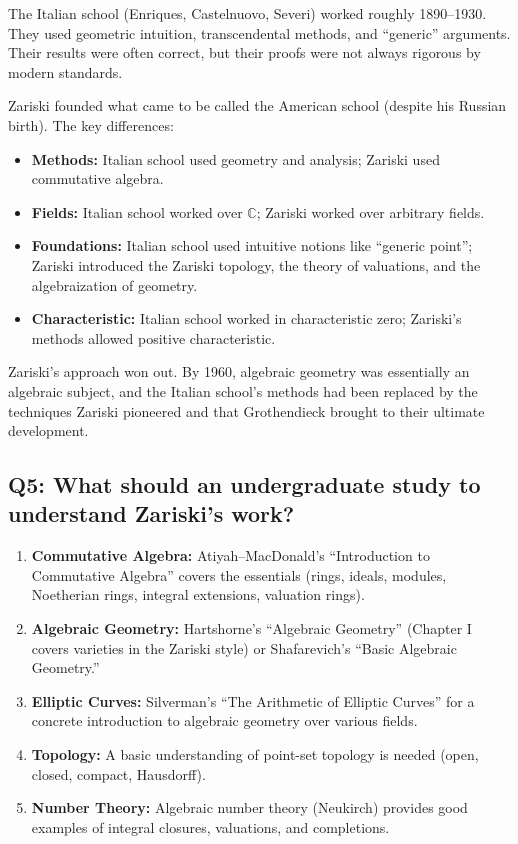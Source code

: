 The Italian school (Enriques, Castelnuovo, Severi) worked roughly 1890--1930. They used geometric intuition, transcendental methods, and ``generic'' arguments. Their results were often correct, but their proofs were not always rigorous by modern standards.

Zariski founded what came to be called the American school (despite his Russian birth). The key differences:
\begin{itemize}
    \item \textbf{Methods:} Italian school used geometry and analysis; Zariski used commutative algebra.
    \item \textbf{Fields:} Italian school worked over $\mathbb{C}$; Zariski worked over arbitrary fields.
    \item \textbf{Foundations:} Italian school used intuitive notions like ``generic point''; Zariski introduced the Zariski topology, the theory of valuations, and the algebraization of geometry.
    \item \textbf{Characteristic:} Italian school worked in characteristic zero; Zariski's methods allowed positive characteristic.
\end{itemize}

Zariski's approach won out. By 1960, algebraic geometry was essentially an algebraic subject, and the Italian school's methods had been replaced by the techniques Zariski pioneered and that Grothendieck brought to their ultimate development.

\subsection*{Q5: What should an undergraduate study to understand Zariski's work?}

\begin{enumerate}
    \item \textbf{Commutative Algebra:} Atiyah--MacDonald's ``Introduction to Commutative Algebra'' covers the essentials (rings, ideals, modules, Noetherian rings, integral extensions, valuation rings).
    \item \textbf{Algebraic Geometry:} Hartshorne's ``Algebraic Geometry'' (Chapter I covers varieties in the Zariski style) or Shafarevich's ``Basic Algebraic Geometry.''
    \item \textbf{Elliptic Curves:} Silverman's ``The Arithmetic of Elliptic Curves'' for a concrete introduction to algebraic geometry over various fields.
    \item \textbf{Topology:} A basic understanding of point-set topology is needed (open, closed, compact, Hausdorff).
    \item \textbf{Number Theory:} Algebraic number theory (Neukirch) provides good examples of integral closures, valuations, and completions.
\end{enumerate}

